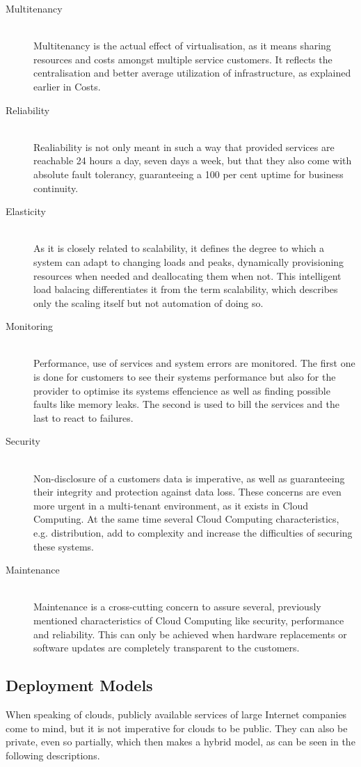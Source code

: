 \begin{description}
	\item[Multitenancy] \hfill \\
		Multitenancy is the actual effect of virtualisation, as it means sharing resources and costs amongst multiple service customers. It reflects the centralisation and better average utilization of infrastructure, as explained earlier in Costs.
	\item[Reliability] \hfill \\
		Realiability is not only meant in such a way that provided services are reachable 24 hours a day, seven days a week, but that they also come with absolute fault tolerancy, guaranteeing a 100 per cent uptime for business continuity.
	\item[Elasticity] \hfill \\
		As it is closely related to scalability, it defines the degree to which a system can adapt to changing loads and peaks, dynamically provisioning resources when needed and deallocating them when not. This intelligent load balacing differentiates it from the term scalability, which describes only the scaling itself but not automation of doing so.
	\item[Monitoring] \hfill \\
		Performance, use of services and system errors are monitored. The first one is done for customers to see their systems performance but also for the provider to optimise its systems effencience as well as finding possible faults like memory leaks. The second is used to bill the services and the last to react to failures.
	\item[Security] \hfill \\
		Non-disclosure of a customers data is imperative, as well as guaranteeing their integrity and protection against data loss. These concerns are even more urgent in a multi-tenant environment, as it exists in Cloud Computing. At the same time several Cloud Computing characteristics, e.g. distribution, add to complexity and increase the difficulties of securing these systems.
	\item[Maintenance] \hfill \\
		Maintenance is a cross-cutting concern to assure several, previously mentioned characteristics of Cloud Computing like security, performance and reliability. This can only be achieved when hardware replacements or software updates are completely transparent to the customers.
\end{description}

\subsection{Deployment Models}
\label{subsec:cloud-deployment-models}
When speaking of clouds, publicly available services of large Internet companies come to mind, but it is not imperative for clouds to be public. They can also be private, even so partially, which then makes a hybrid model, as can be seen in the following descriptions.

